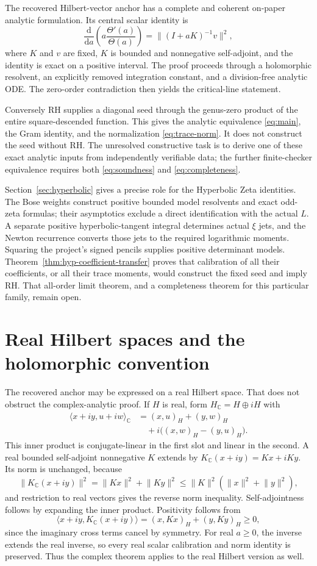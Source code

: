 \documentclass[11pt,a4paper]{article}
\numberwithin{equation}{section}
\theoremstyle{definition}
\theoremstyle{remark}
\newcommand{\C}{\mathbb C}
\newcommand{\ip}[2]{\langle #1,#2\rangle}
\newcommand{\norm}[1]{\lVert #1\rVert}
\begin{document}
The recovered Hilbert-vector anchor has a complete and coherent
on-paper analytic formulation. Its central scalar identity is
\[
\frac{\mathrm d}{\mathrm da}\left(a\frac{\Theta'(a)}{\Theta(a)}\right)
=\norm{(I+aK)^{-1}v}^2,
\]
where $K$ and $v$ are fixed, $K$ is bounded and nonnegative
self-adjoint, and the identity is exact on a positive interval.
The proof proceeds through a holomorphic resolvent, an explicitly
removed integration constant, and a division-free analytic ODE.
The zero-order contradiction then yields the critical-line statement.

Conversely RH supplies a diagonal seed through the genus-zero
product of the entire square-descended function. This gives the
analytic equivalence \eqref{eq:main}, the Gram identity, and the
normalization \eqref{eq:trace-norm}. It does not construct the seed
without RH. The unresolved constructive task is to derive one of
these exact analytic inputs from independently verifiable data;
the further finite-checker equivalence requires both
\eqref{eq:soundness} and \eqref{eq:completeness}.


Section~\ref{sec:hyperbolic} gives a precise role for the Hyperbolic
Zeta identities. The Bose weights construct positive bounded model
resolvents and exact odd-zeta formulas; their asymptotics exclude a
direct identification with the actual $L$. A separate positive
hyperbolic-tangent integral determines actual $\xi$ jets, and the
Newton recurrence converts those jets to the required logarithmic
moments. Squaring the project's signed pencils supplies positive
determinant models. Theorem~\ref{thm:hyp-coefficient-transfer} proves
that calibration of all their coefficients, or all their trace moments,
would construct the fixed seed and imply RH. That all-order limit
theorem, and a completeness theorem for this particular family,
remain open.

\appendix
\section[Real Hilbert spaces]{Real Hilbert spaces and the holomorphic convention}\label{app:real}

The recovered anchor may be expressed on a real Hilbert space.
That does not obstruct the complex-analytic proof. If $H$ is real,
form $H_\C=H\oplus iH$ with
\begin{align*}
\ip{x+iy}{u+iw}_{\C}
&=(x,u)_H+(y,w)_H\\
&\quad+i\bigl((x,w)_H-(y,u)_H\bigr).
\end{align*}
This inner product is conjugate-linear in the first slot and linear
in the second. A real bounded self-adjoint nonnegative $K$ extends
by $K_\C(x+iy)=Kx+iKy$. Its norm is unchanged, because
\[
\norm{K_\C(x+iy)}^2=\norm{Kx}^2+\norm{Ky}^2
\leq\norm K^2(\norm x^2+\norm y^2),
\]
and restriction to real vectors gives the reverse norm inequality.
Self-adjointness follows by expanding the inner product. Positivity
follows from
\[
\ip{x+iy}{K_\C(x+iy)}=(x,Kx)_H+(y,Ky)_H\geq0,
\]
since the imaginary cross terms cancel by symmetry.
For real $a\geq0$, the inverse extends the real inverse, so every
real scalar calibration and norm identity is preserved. Thus the
complex theorem applies to the real Hilbert version as well.
\end{document}
